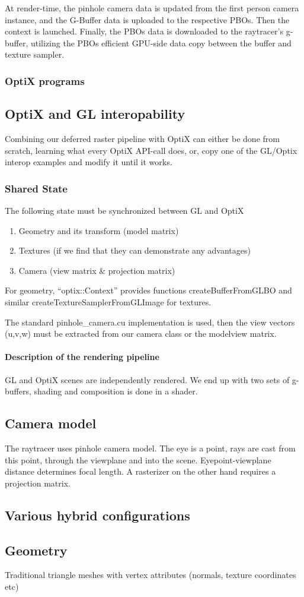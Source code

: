 At render-time, the pinhole camera data is updated from the first person camera instance, and the G-Buffer data is uploaded to the respective PBOs. Then the context is launched. Finally, the PBOs data is downloaded to the raytracer's g-buffer, utilizing the PBOs efficient GPU-side data copy between the buffer and texture sampler.

\subsubsection{OptiX programs}

\subsection{OptiX and GL interopability}
Combining our deferred raster pipeline with OptiX can either be done from scratch, learning what every OptiX API-call does, or, copy one of the GL/Optix interop examples and modify it until it works.

\subsubsection{Shared State}
The following state must be synchronized between GL and OptiX

\begin{enumerate}
	\item Geometry and its transform (model matrix)
	\item Textures (if we find that they can demonstrate any advantages)
	\item Camera (view matrix \& projection matrix)
\end{enumerate}

For geometry, ``optix::Context'' provides functions createBufferFromGLBO and similar createTextureSamplerFromGLImage for textures.

The standard pinhole\_camera.cu implementation is used, then the view vectors (u,v,w) must be extracted from our camera class or the modelview matrix.

\paragraph{Description of the rendering pipeline}

GL and OptiX scenes are independently rendered. We end up with two sets of g-buffers, shading and composition is done in a shader.

\subsection{Camera model}
The raytracer uses pinhole camera model. The eye is a point, rays are cast from this point, through the viewplane and into the scene. Eyepoint-viewplane distance determines focal length. A rasterizer on the other hand requires a projection matrix.

\subsection{Various hybrid configurations}

\subsection{Geometry}
Traditional triangle meshes with vertex attributes (normals, texture coordinates etc)

